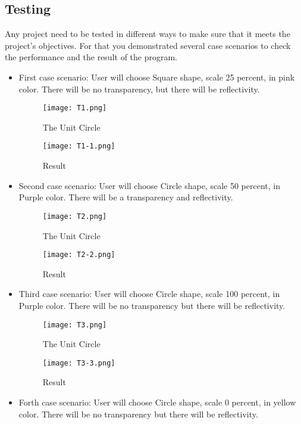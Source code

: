 \documentclass{article}
\begin{document}
\subsection{Testing}
Any project need to be tested in different ways to make sure that it meets the project’s objectives. For that you demonstrated several case scenarios to check the performance and the result of the program. \newline

\begin{itemize}
    \item First case scenario: \newline
    User will choose Square shape, scale 25 percent, in pink color. There will be no transparency, but there will be reflectivity. 
    
   \begin{figure}[H]
\centering
\texttt{[image: T1.png]}
\caption{The Unit Circle \label{fig1}}
\end{figure}

 
 \begin{figure}
    \centering
    \texttt{[image: T1-1.png]}
    \caption{Result}
    \label{fig3}
\end{figure}



\item Second case scenario: \newline
User will choose Circle shape, scale 50 percent, in Purple color. There will be a transparency and reflectivity. 

\begin{figure}[H]
\centering
\texttt{[image: T2.png]}
\caption{The Unit Circle \label{fig1}}
\end{figure}

\begin{figure}
    \centering
    \texttt{[image: T2-2.png]}
    \caption{Result}
    \label{fig5}
\end{figure}

\item Third case scenario: \newline
User will choose Circle shape, scale 100 percent, in Purple color. There will be no transparency but there will be reflectivity.

\begin{figure}[H]
\centering
\texttt{[image: T3.png]}
\caption{The Unit Circle \label{fig1}}
\end{figure}

\begin{figure}
    \centering
    \texttt{[image: T3-3.png]}
    \caption{Result}
    \label{fig5}
\end{figure}

\item Forth case scenario: \newline
User will choose Circle shape, scale 0 percent, in yellow color. There will be no transparency but there will be reflectivity.

\end{itemize}
\end{document}
